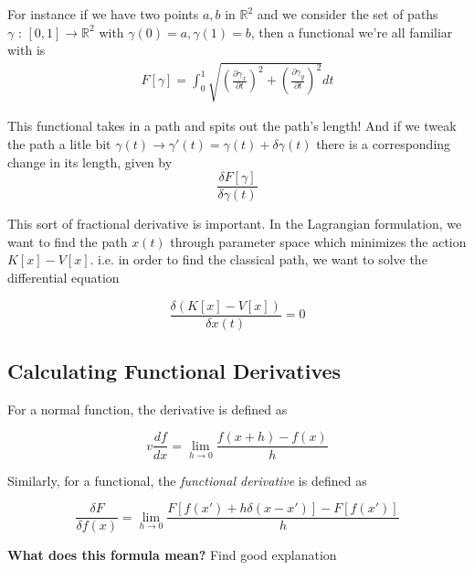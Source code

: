 \documentclass[11pt]{article}
\begin{document}
\vskip 0.5cm
For instance if we have two points $a, b$ in $\mathbb{R}^2$ and we consider the set of paths $\gamma \text{ : } [0, 1] \rightarrow \mathbb{R}^2$ with $\gamma(0) = a, \gamma(1) = b$, then a functional we're all familiar with is 
\begin{align*}
    F[\gamma] = \int_{0}^{1} \sqrt{\left(\frac{\partial \gamma_x}{\partial t}\right)^2 + \left(\frac{\partial \gamma_y}{\partial t}\right)^2  } dt
\end{align*}

This functional takes in a path and spits out the path's length! And if we tweak the path a litle bit $\gamma(t) \rightarrow \gamma'(t) = \gamma(t) + \delta \gamma(t)$ there is a corresponding change in its length, given by 
\[ \frac{\delta F[\gamma]}{\delta \gamma(t)} \]

\vskip 0.5cm
This sort of fractional derivative is important. In the Lagrangian formulation, we want to find the path $x(t)$ through parameter space which minimizes the action $K[x] - V[x]$. i.e. in order to find the classical path, we want to solve the differential equation

\[  \frac{\delta \left(K[x] - V[x]\right)}{\delta x(t)} = 0 \]

\subsection*{Calculating Functional Derivatives}
For a normal function, the derivative is defined as 

\[v \frac{df}{dx} = \lim_{h \rightarrow 0} \frac{f(x + h) - f(x)}{h} \]

Similarly, for a functional, the \emph{functional derivative} is defined as 

\[ \frac{\delta F}{\delta f(x)} = \lim_{h \rightarrow 0} \frac{F[f(x') + h \delta(x - x')] - F[f(x')]}{h} \]

\begin{bluebox}
    \textbf{What does this formula mean?}
    \vskip 0.5cm
    Find good explanation
\end{bluebox}

\end{document}
